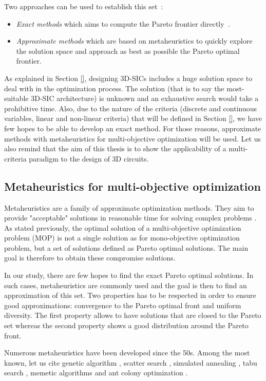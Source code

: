 Two approaches can be used to establish this set~\cite{Vin92}:
\begin{itemize}
\item \textit{Exact methods} which aims to compute the Pareto frontier directly~\cite{EhrgottGandibleuxbook02,steuer86a}.
\item \textit{Approximate methods} which are based on metaheuristics to quickly explore the solution space and approach as best as possible the Pareto optimal frontier\cite{talbi09}.
\end{itemize}
As explained in Section \ref{}, designing 3D-SICs includes a huge solution space to deal with in the optimization process. The solution (that is to say the most-suitable 3D-SIC architecture) is unknown and an exhaustive search would take a prohibitive time. Also, due to the nature of the criteria (discrete and continuous variables, linear and non-linear criteria) that will be defined in Section \ref{}, we have few hopes to be able to develop an exact method. For those reasons, approximate methods with metaheuristics for multi-objective optimization will be used. Let us also remind that the aim of this thesis is to show the applicability of a multi-criteria paradigm to the design of 3D circuits.

\subsection{Metaheuristics for multi-objective optimization}
\label{subsec:metaheuristics}
Metaheuristics are a family of approximate optimization methods. They aim to provide "acceptable" solutions in reasonable time for solving complex problems \cite{talbi09}. As stated previously, the optimal solution of a multi-objective optimization problem (MOP) is not a single solution as for mono-objective optimization problem, but a set of solutions defined as Pareto optimal solutions. The main goal is therefore to obtain these compromise solutions.

In our study, there are few hopes to find the exact Pareto optimal solutions. In such cases, metaheuristics are commonly used and the goal is then to find an approximation of this set. Two properties has to be respected in order to ensure good approximations: convergence to the Pareto optimal front and uniform diversity. The first property allows to have solutions that are closed to the Pareto set whereas the second property shows a good distribution around the Pareto front.

Numerous metaheuristics have been developed since the 50s. Among the most known, let us cite genetic algorithm \cite{holland1975adaptation}, scatter search \cite{Glover77}, simulated annealing \cite{KirkpatrickGelattVecchi83}, tabu search \cite{Glover86}, memetic algorithms \cite{moscato89on} and ant colony optimization \cite{Dor92a.phd}.

